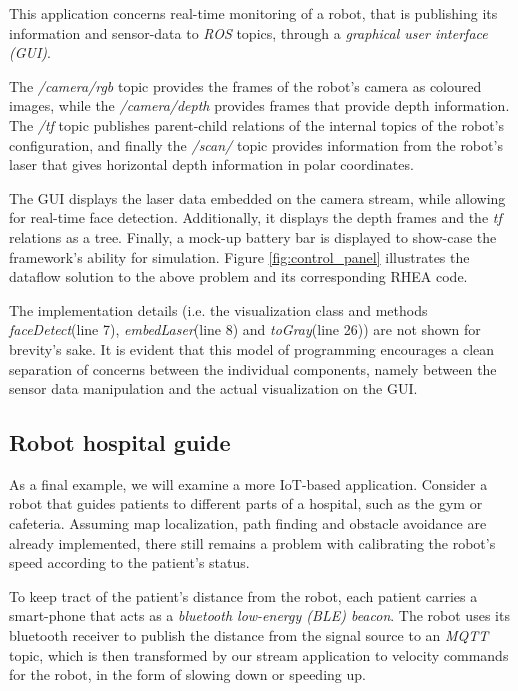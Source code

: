 \documentclass[sigplan,review,anonymous]{acmart}\settopmatter{printfolios=true,printacmref=false}
\begin{document}
This application concerns real-time monitoring of a robot, that is publishing its information and sensor-data to \textit{ROS} topics, through a \textit{graphical user interface (GUI)}.

The \textit{/camera/rgb} topic provides the frames of the robot's camera as coloured images, while the \textit{/camera/depth} provides frames that provide depth information. The \textit{/tf} topic publishes parent-child relations of the internal topics of the robot's configuration, and finally the \textit{/scan/} topic provides information from the robot's laser that gives horizontal depth information in polar coordinates.

The GUI displays the laser data embedded on the camera stream, while allowing for real-time face detection. Additionally, it displays the depth frames and the \textit{tf} relations as a tree. Finally, a mock-up battery bar is displayed to show-case the framework's ability for simulation. Figure \ref{fig:control_panel} illustrates the dataflow solution to the above problem and its corresponding \textsc{RHEA} code.


The implementation details (i.e. the visualization class and methods \textit{faceDetect}(line 7), \textit{embedLaser}(line 8) and \textit{toGray}(line 26)) are not shown for brevity's sake. It is evident that this model of programming encourages a clean separation of concerns between the individual components, namely between the sensor data manipulation and the actual visualization on the GUI.

\subsection{Robot hospital guide}

As a final example, we will examine a more IoT-based application. Consider a robot that guides patients to different parts of a hospital, such as the gym or cafeteria. Assuming map localization, path finding and obstacle avoidance are already implemented, there still remains a problem with calibrating the robot's speed according to the patient's status.

To keep tract of the patient's distance from the robot, each patient carries a smart-phone that acts as a \textit{bluetooth low-energy (BLE) beacon}. The robot uses its bluetooth receiver to publish the distance from the signal source to an \textit{MQTT} topic, which is then transformed by our stream application to velocity commands for the robot, in the form of slowing down or speeding up.
\end{document}
